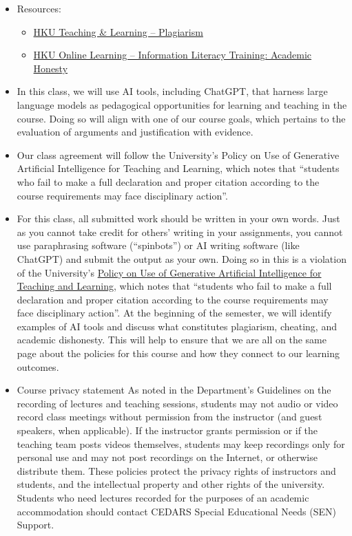 \documentclass[
  letterpaper,
  DIV=11,
  numbers=noendperiod]{scrartcl}
\providecommand{\tightlist}{%
  \setlength{\itemsep}{0pt}\setlength{\parskip}{0pt}}
\begin{document}
\begin{itemize}
\item
  Resources:

  \begin{itemize}
  \tightlist
  \item
    \href{https://tl.hku.hk/plagiarism/}{HKU Teaching \& Learning --
    Plagiarism}
  \item
    \href{https://learning.hku.hk/catalog/course/ilt01/}{HKU Online
    Learning -- Information Literacy Training: Academic Honesty}
  \end{itemize}
\item
  In this class, we will use AI tools, including ChatGPT, that harness
  large language models as pedagogical opportunities for learning and
  teaching in the course. Doing so will align with one of our course
  goals, which pertains to the evaluation of arguments and justification
  with evidence.
\item
  Our class agreement will follow the University's Policy on Use of
  Generative Artificial Intelligence for Teaching and Learning, which
  notes that ``students who fail to make a full declaration and proper
  citation according to the course requirements may face disciplinary
  action''.
\item
  For this class, all submitted work should be written in your own
  words. Just as you cannot take credit for others' writing in your
  assignments, you cannot use paraphrasing software (``spinbots'') or AI
  writing software (like ChatGPT) and submit the output as your own.
  Doing so in this is a violation of the University's
  \href{https://intraweb.hku.hk/reserved_1/tlearn/genai/gaitf-policy-dissemination-202309.pdf}{Policy
  on Use of Generative Artificial Intelligence for Teaching and
  Learning}, which notes that ``students who fail to make a full
  declaration and proper citation according to the course requirements
  may face disciplinary action''. At the beginning of the semester, we
  will identify examples of AI tools and discuss what constitutes
  plagiarism, cheating, and academic dishonesty. This will help to
  ensure that we are all on the same page about the policies for this
  course and how they connect to our learning outcomes.
\item
  Course privacy statement As noted in the Department's Guidelines on
  the recording of lectures and teaching sessions, students may not
  audio or video record class meetings without permission from the
  instructor (and guest speakers, when applicable). If the instructor
  grants permission or if the teaching team posts videos themselves,
  students may keep recordings only for personal use and may not post
  recordings on the Internet, or otherwise distribute them. These
  policies protect the privacy rights of instructors and students, and
  the intellectual property and other rights of the university. Students
  who need lectures recorded for the purposes of an academic
  accommodation should contact CEDARS Special Educational Needs (SEN)
  Support.
\end{itemize}
\end{document}
